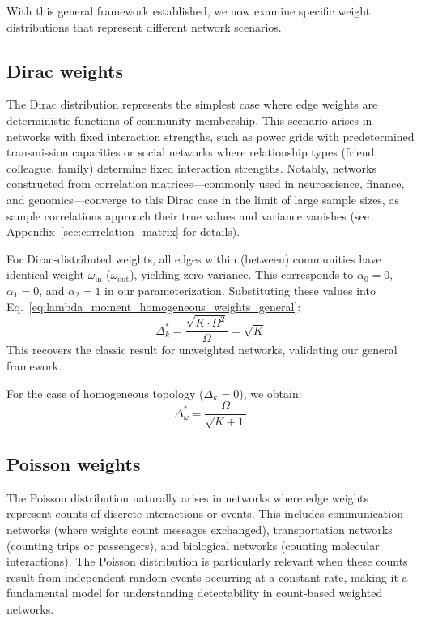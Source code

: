 \documentclass[a4paper,pre,superscriptaddress,floatfix,nofootinbib,twocolumn]{revtex4-1}
\begin{document}
With this general framework established, we now examine specific weight distributions that represent different network scenarios.

\subsection*{Dirac weights}
\label{sec:dirac_weights}

The Dirac distribution represents the simplest case where edge weights are deterministic functions of community membership. This scenario arises in networks with fixed interaction strengths, such as power grids with predetermined transmission capacities or social networks where relationship types (friend, colleague, family) determine fixed interaction strengths. Notably, networks constructed from correlation matrices---commonly used in neuroscience, finance, and genomics---converge to this Dirac case in the limit of large sample sizes, as sample correlations approach their true values and variance vanishes (see Appendix~\ref{sec:correlation_matrix} for details).

For Dirac-distributed weights, all edges within (between) communities have identical weight $\omega_{\text{in}}$ ($\omega_{\text{out}}$), yielding zero variance. This corresponds to $\alpha_0 = 0$, $\alpha_1 = 0$, and $\alpha_2 = 1$ in our parameterization. Substituting these values into Eq.~\eqref{eq:lambda_moment_homogeneous_weights_general}:
\begin{equation}
\Delta_k^* = \frac{\sqrt{K \cdot \Omega^2}}{\Omega} = \sqrt{K}
\label{eq:dirac_det}
\end{equation}
This recovers the classic result for unweighted networks, validating our general framework.

For the case of homogeneous topology ($\Delta_{\kappa} = 0$), we obtain:
\begin{equation}
\Delta_\omega^* = \frac{\Omega}{\sqrt{K+1}}
\label{eq:dirac_w_det}
\end{equation}

\subsection*{Poisson weights}

The Poisson distribution naturally arises in networks where edge weights represent counts of discrete interactions or events. This includes communication networks (where weights count messages exchanged), transportation networks (counting trips or passengers), and biological networks (counting molecular interactions). The Poisson distribution is particularly relevant when these counts result from independent random events occurring at a constant rate, making it a fundamental model for understanding detectability in count-based weighted networks.
\end{document}
